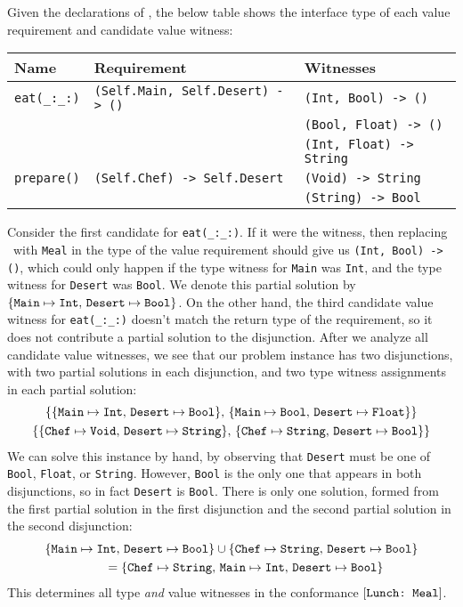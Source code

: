 \documentclass[../generics]{subfiles}
\begin{document}
\begin{example}\label{assoc type inference example 2}
Given the declarations of , the below table shows the interface type of each value requirement and candidate value witness:
\begin{center}
\begin{tabular}{lll}
\toprule
\textbf{Name}&\textbf{Requirement}&\textbf{Witnesses}\\
\midrule
\verb|eat(_:_:)|&\verb|(Self.Main, Self.Desert) -> ()|&\verb|(Int, Bool) -> ()|\\
&&\verb|(Bool, Float) -> ()|\\
&&\verb|(Int, Float) -> String|\\
\midrule
\verb|prepare()|&\verb|(Self.Chef) -> Self.Desert|&\verb|(Void) -> String|\\
&&\verb|(String) -> Bool|\\
\bottomrule
\end{tabular}
\end{center}
Consider the first candidate for \verb|eat(_:_:)|. If it were the witness, then replacing \tSelf\ with \texttt{Meal} in the type of the value requirement should give us \verb|(Int, Bool) -> ()|, which could only happen if the type witness for \texttt{Main} was \texttt{Int}, and the type witness for \texttt{Desert} was \texttt{Bool}. We denote this partial solution by $\{ \texttt{Main} \mapsto \texttt{Int},\, \texttt{Desert} \mapsto \texttt{Bool} \}$. On the other hand, the third candidate value witness for \verb|eat(_:_:)| doesn't match the return type of the requirement, so it does not contribute a partial solution to the disjunction. After we analyze all candidate value witnesses, we see that our problem instance has two disjunctions, with two partial solutions in each disjunction, and two type witness assignments in each partial solution:
\begin{gather*}
\{\{ \texttt{Main} \mapsto \texttt{Int},\, \texttt{Desert} \mapsto \texttt{Bool} \},\,
\{ \texttt{Main} \mapsto \texttt{Bool},\, \texttt{Desert} \mapsto \texttt{Float} \}\}\\
\{\{ \texttt{Chef} \mapsto \texttt{Void},\, \texttt{Desert} \mapsto \texttt{String} \},\,
\{ \texttt{Chef} \mapsto \texttt{String},\, \texttt{Desert} \mapsto \texttt{Bool} \}\}
\end{gather*}
We can solve this instance by hand, by observing that \texttt{Desert} must be one of \texttt{Bool}, \texttt{Float}, or \texttt{String}. However, \texttt{Bool} is the only one that appears in both disjunctions, so in fact \texttt{Desert} is \texttt{Bool}. There is only one solution, formed from the first partial solution in the first disjunction and the second partial solution in the second disjunction:
\begin{gather*}
\{ \texttt{Main} \mapsto \texttt{Int},\, \texttt{Desert} \mapsto \texttt{Bool} \}
\cup
\{ \texttt{Chef} \mapsto \texttt{String},\, \texttt{Desert} \mapsto \texttt{Bool} \}\\
\qquad {} =
\{ \texttt{Chef} \mapsto \texttt{String},\, \texttt{Main} \mapsto \texttt{Int},\, \texttt{Desert} \mapsto \texttt{Bool} \}
\end{gather*}
This determines all type \emph{and} value witnesses in the conformance $[\texttt{Lunch:~Meal}]$.
\end{example}
\end{document}
